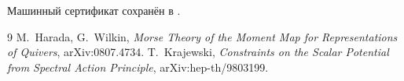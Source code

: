 Машинный сертификат сохранён в
.

\begin{thebibliography}{9}
 M.~Harada, G.~Wilkin,
\emph{Morse Theory of the Moment Map for Representations of Quivers},
arXiv:0807.4734.
 T.~Krajewski,
\emph{Constraints on the Scalar Potential from Spectral Action Principle},
arXiv:hep-th/9803199.
\end{thebibliography}